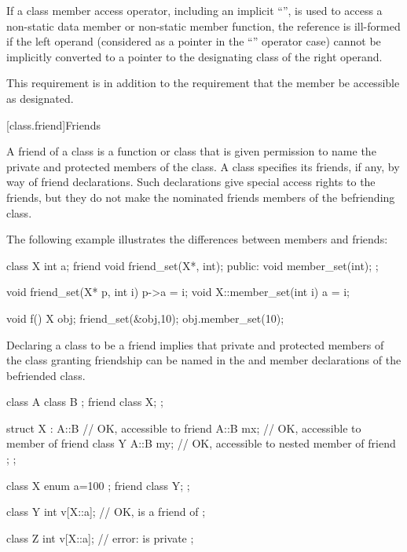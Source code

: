 \pnum
If a class member access operator, including an implicit
``'',
is used to access a non-static data member or non-static
member function, the reference is ill-formed if the
left operand (considered as a pointer in the
``''
operator case) cannot be implicitly converted to a
pointer to the designating class of the right operand.
\begin{note}
This requirement is in addition to the requirement that
the member be accessible as designated.
\end{note}

[class.friend]{Friends}%
%

\pnum
A friend of a class is a function or class that is
given permission to name the private and protected members of the class.
A class specifies its friends, if any, by way of friend declarations.
Such declarations give special access rights to the friends, but they
do not make the nominated friends members of the befriending class.
\begin{example}
The following example illustrates the differences between
members and friends:
%

\begin{codeblock}
class X {
  int a;
  friend void friend_set(X*, int);
public:
  void member_set(int);
};

void friend_set(X* p, int i) { p->a = i; }
void X::member_set(int i) { a = i; }

void f() {
  X obj;
  friend_set(&obj,10);
  obj.member_set(10);
}
\end{codeblock}
\end{example}

\pnum
{}%
Declaring a class to be a friend implies that private and
protected members of the class granting friendship can be named in the
 and member declarations of the befriended
class.
\begin{example}
\begin{codeblock}
class A {
  class B { };
  friend class X;
};

struct X : A::B {               // OK,  accessible to friend
  A::B mx;                      // OK,  accessible to member of friend
  class Y {
    A::B my;                    // OK,  accessible to nested member of friend
  };
};
\end{codeblock}
\end{example}
\begin{example}
\begin{codeblock}
class X {
  enum { a=100 };
  friend class Y;
};

class Y {
  int v[X::a];                  // OK,  is a friend of 
};

class Z {
  int v[X::a];                  // error:  is private
};
\end{codeblock}
\end{example}

